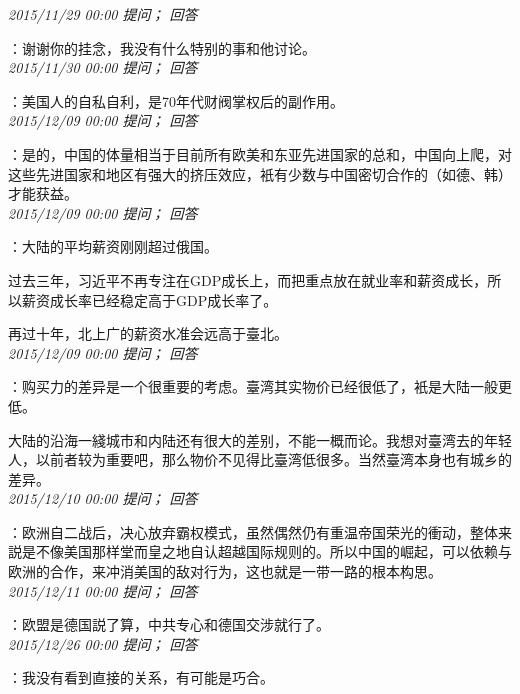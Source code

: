 \documentclass[twocolumn]{ctexart}
\begin{document}
\textit{\hfill\noindent\small 2015/11/29 00:00 提问； 回答}

：谢谢你的挂念，我没有什么特别的事和他讨论。\\

\textit{\hfill\noindent\small 2015/11/30 00:00 提问； 回答}

：美国人的自私自利，是70年代财阀掌权后的副作用。\\

\textit{\hfill\noindent\small 2015/12/09 00:00 提问； 回答}

：是的，中国的体量相当于目前所有欧美和东亚先进国家的总和，中国向上爬，对这些先进国家和地区有强大的挤压效应，衹有少数与中国密切合作的（如德、韩）才能获益。\\

\textit{\hfill\noindent\small 2015/12/09 00:00 提问； 回答}

：大陆的平均薪资刚刚超过俄国。

过去三年，习近平不再专注在GDP成长上，而把重点放在就业率和薪资成长，所以薪资成长率已经稳定高于GDP成长率了。

再过十年，北上广的薪资水准会远高于臺北。\\

\textit{\hfill\noindent\small 2015/12/09 00:00 提问； 回答}

：购买力的差异是一个很重要的考虑。臺湾其实物价已经很低了，衹是大陆一般更低。

大陆的沿海一綫城市和内陆还有很大的差别，不能一概而论。我想对臺湾去的年轻人，以前者较为重要吧，那么物价不见得比臺湾低很多。当然臺湾本身也有城乡的差异。\\

\textit{\hfill\noindent\small 2015/12/10 00:00 提问； 回答}

：欧洲自二战后，决心放弃霸权模式，虽然偶然仍有重温帝国荣光的衝动，整体来説是不像美国那样堂而皇之地自认超越国际规则的。所以中国的崛起，可以依赖与欧洲的合作，来冲消美国的敌对行为，这也就是一带一路的根本构思。\\

\textit{\hfill\noindent\small 2015/12/11 00:00 提问； 回答}

：欧盟是德国説了算，中共专心和德国交涉就行了。\\

\textit{\hfill\noindent\small 2015/12/26 00:00 提问； 回答}

：我没有看到直接的关系，有可能是巧合。
\end{document}
